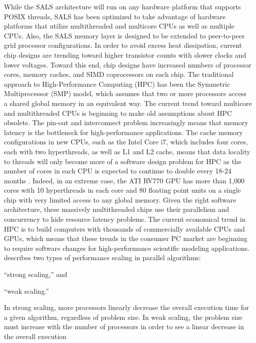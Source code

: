 While the SALS architecture will run on any hardware platform that
supports POSIX threads, SALS has been optimized to take advantage of
hardware platforms that utilize multithreaded and multicore CPUs as
well as multiple CPUs.  Also, the SALS memory layer is designed to be
extended to peer-to-peer grid processor configurations.  In order to
avoid excess heat dissipation, current chip designs are trending
toward higher transistor counts with slower clocks and lower voltages.
Toward this end, chip designs have increased numbers of processor
cores, memory caches, and SIMD coprocessors on each chip.  The
traditional approach to High-Performance Computing (HPC) has been the
Symmetric Multiprocessor (SMP) model, which assumes that two or more
processors access a shared global memory in an equivalent way.  The
current trend toward multicore and multithreaded CPUs is beginning to
make old assumptions about HPC obsolete.  The pin-out and interconnect
problem increasingly means that memory latency is the bottleneck for
high-performance applications.  The cache memory configurations in new
CPUs, such as the Intel Core i7, which includes four cores, each with
two hyperthreads, as well as L1 and L2 cache, means that data locality
to threads will only become more of a software design problem for HPC
as the number of cores in each CPU is expected to continue to double
every 18-24 months \cite[]{sodan:2010,dongarra:2007}.  Indeed, in an
extreme case, the ATI RV770 GPU has more than 1,000 cores with 10
hyperthreads in each core and 80 floating point units on a single chip
with very limited access to any global memory.  Given the right
software architecture, these massively multithreaded chips use their
parallelism and concurrency to hide resource latency problems.  The
current economical trend in HPC is to build computers with thousands
of commercially available CPUs and GPUs, which means that these trends
in the consumer PC market are beginning to require software changes
for high-performance scientific modeling applications.
\cite{sodan:2010} describes two types of performance scaling in
parallel algorithms:
\begin{packed_enumerate}
\item{``strong scaling,'' and}
\item{``weak scaling.''}
\end{packed_enumerate}
In strong scaling, more processors linearly decrease the overall
execution time for a given algorithm, regardless of problem size.  In
weak scaling, the problem size must increase with the number of
processors in order to see a linear decrease in the overall execution

